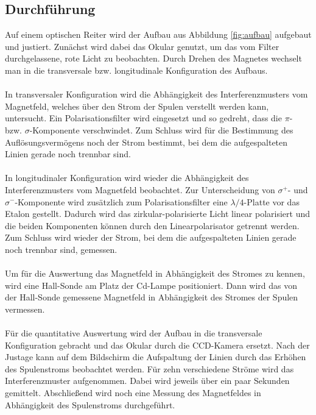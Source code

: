 \subsection{Durchführung}
Auf einem optischen Reiter wird der Aufbau aus Abbildung \ref{fig:aufbau} aufgebaut und justiert. Zunächst wird dabei das Okular genutzt, um das vom Filter durchgelassene, rote Licht zu beobachten. Durch Drehen des Magnetes wechselt man in die transversale bzw. longitudinale Konfiguration des Aufbaus. \\ \\
In transversaler Konfiguration wird die Abhängigkeit des Interferenzmusters vom Magnetfeld, welches über den Strom der Spulen verstellt werden kann, untersucht. Ein Polarisationsfilter wird eingesetzt und so gedreht, dass die $\pi$- bzw. $\sigma$-Komponente verschwindet. Zum Schluss wird für die Bestimmung des Auflösungsvermögens noch der Strom bestimmt, bei dem die aufgespalteten Linien gerade noch trennbar sind.\\ \\
In longitudinaler Konfiguration wird wieder die Abhängigkeit des Interferenzmusters vom Magnetfeld beobachtet. Zur Unterscheidung von $\sigma^+$- und $\sigma^-$-Komponente wird zusätzlich zum Polarisationsfilter eine $\lambda/4$-Platte vor das Etalon gestellt. Dadurch wird das zirkular-polarisierte Licht linear polarisiert und die beiden Komponenten können durch den Linearpolarisator getrennt werden. Zum Schluss wird wieder der Strom, bei dem die aufgespalteten Linien gerade noch trennbar sind, gemessen. \\ \\
Um für die Auswertung das Magnetfeld in Abhängigkeit des Stromes zu kennen, wird eine Hall-Sonde am Platz der Cd-Lampe positioniert. Dann wird das von der Hall-Sonde gemessene Magnetfeld in Abhängigkeit des Stromes der Spulen vermessen.\\ \\
Für die quantitative Auswertung wird der Aufbau in die transversale Konfiguration gebracht und das Okular durch die CCD-Kamera ersetzt. Nach der Justage kann auf dem Bildschirm die Aufspaltung der Linien durch das Erhöhen des Spulenstroms beobachtet werden. Für zehn verschiedene Ströme wird das Interferenzmuster aufgenommen. Dabei wird jeweils über ein paar Sekunden gemittelt. Abschließend wird noch eine Messung des Magnetfeldes in Abhängigkeit des Spulenstroms durchgeführt. 

